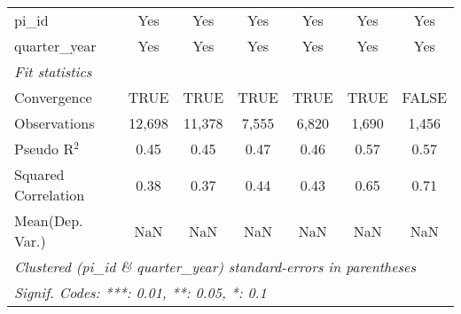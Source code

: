 \begin{tabular}{lcccccc}
   pi\_id                                                     & Yes            & Yes            & Yes           & Yes           & Yes           & Yes\\  
   quarter\_year                                              & Yes            & Yes            & Yes           & Yes           & Yes           & Yes\\  
   \midrule
   \emph{Fit statistics}\\
   Convergence                                                &TRUE            & TRUE           & TRUE          & TRUE          & TRUE          & FALSE\\  
   Observations                                               & 12,698         & 11,378         & 7,555         & 6,820         & 1,690         & 1,456\\  
   Pseudo R$^2$                                               & 0.45           & 0.45           & 0.47          & 0.46          & 0.57          & 0.57\\  
   Squared Correlation                                        & 0.38           & 0.37           & 0.44          & 0.43          & 0.65          & 0.71\\  
Mean(Dep. Var.) & NaN & NaN & NaN & NaN & NaN & NaN \\
   \midrule \midrule
   \multicolumn{7}{l}{\emph{Clustered (pi\_id \& quarter\_year) standard-errors in parentheses}}\\
   \multicolumn{7}{l}{\emph{Signif. Codes: ***: 0.01, **: 0.05, *: 0.1}}\\
\end{tabular}
\par\endgroup
